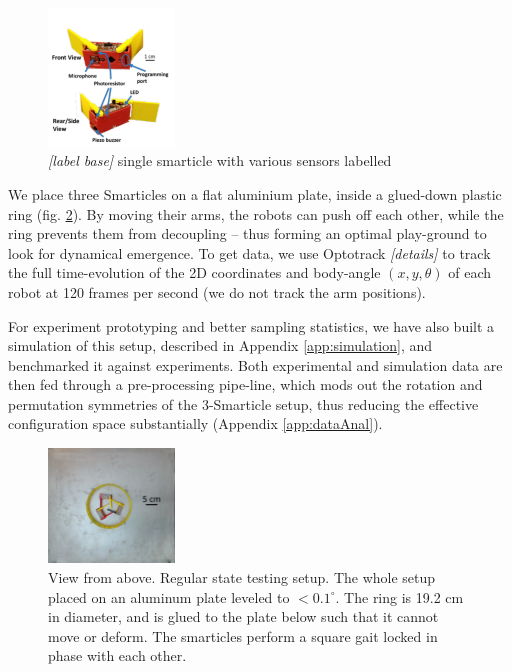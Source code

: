 \documentclass[11pt]{article}
\renewcommand{\=}[1]{\stackrel{#1}{=}} %
\renewcommand{\deg}{^{\circ}} %
\renewcommand{\(}{\left (}
\renewcommand{\)}{\right  )}
\renewcommand{\[}{\left [}
\renewcommand{\]}{\right ]}
\newcommand{\<}{\left <}
\renewcommand{\>}{\right >}
\theoremstyle{definition}
\theoremstyle{remark}
\renewcommand{\todo}[1]{\textit{\color{red}[#1]}}
\begin{document}
\begin{figure} 
	\includegraphics[width=0.3\textwidth]{Smarticle.pdf}
	\caption{\todo{label base} single smarticle with various sensors labelled}
	\label{fig:smarticle}
\end{figure}

We place three Smarticles on a flat aluminium plate, inside a glued-down plastic ring (fig. \ref{fig:super3}). By moving their arms, the robots can push off each other, while the ring prevents them from decoupling -- thus forming an optimal play-ground to look for dynamical emergence. To get data, we use Optotrack \todo{details} to track the full time-evolution of the 2D coordinates and body-angle $ (x,y,\theta) $ of each robot at 120 frames per second (we do not track the arm positions). 

For experiment prototyping and better sampling statistics, we have also built a simulation of this setup, described in Appendix \ref{app:simulation}, and benchmarked it against experiments. Both experimental and simulation data are then fed through a pre-processing pipe-line, which mods out the rotation and permutation symmetries of the 3-Smarticle setup, thus reducing the effective configuration space substantially (Appendix \ref{app:dataAnal}).

\begin{figure}
	\includegraphics[width=0.3\textwidth]{3smRg.pdf}
	\caption{View from above. Regular state testing setup. The whole setup placed on an aluminum plate leveled to $ < 0.1\deg $. The ring is 19.2 cm in diameter, and is glued to the plate below such that it cannot move or deform. The smarticles perform a square gait locked in phase with each other.}
	\label{fig:super3}
\end{figure}
\end{document}
